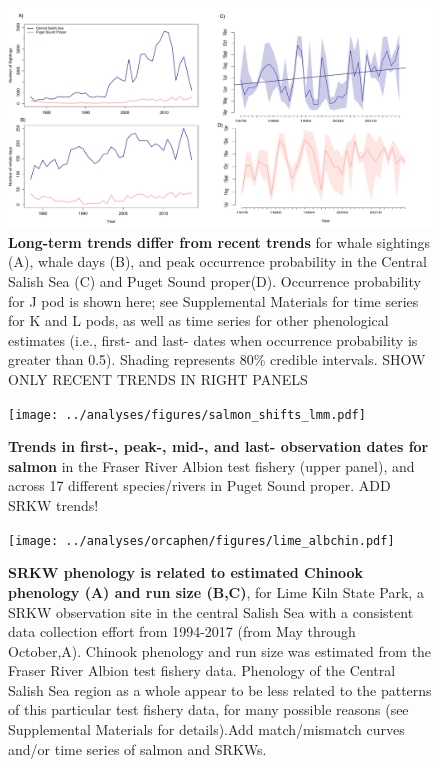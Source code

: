 \documentclass{article}
\begin{document}
\begin{figure}[p]
\includegraphics{../analyses/figures/OrcaPhenPlots/timeseries_1976_assumeSRKW2regs.pdf} 
\caption{\textbf{Long-term trends differ from recent trends} for whale sightings (A), whale days (B), and peak occurrence probability in the Central Salish Sea (C) and Puget Sound proper(D). Occurrence probability for J pod is shown here; see Supplemental Materials for time series for K and L pods, as well as time series for other phenological estimates (i.e., first- and last- dates when occurrence probability is greater than 0.5). Shading represents 80\% credible intervals. SHOW ONLY RECENT TRENDS IN RIGHT PANELS}
 \label{fig:timeseries}
 \end{figure}
 

\begin{figure}[p]
\texttt{[image: ../analyses/figures/salmon\_shifts\_lmm.pdf]} 
\caption{\textbf{Trends in first-, peak-, mid-, and last- observation dates for salmon} in the Fraser River Albion test fishery (upper panel), and across 17 different species/rivers in Puget Sound proper. ADD SRKW trends!}
 \label{fig:shifts}
 \end{figure}

\begin{figure}[p]
\texttt{[image: ../analyses/orcaphen/figures/lime\_albchin.pdf]} 
\caption{\textbf{SRKW phenology is related to estimated Chinook phenology (A) and run size (B,C)}, for Lime Kiln State Park, a SRKW observation site in the central Salish Sea with a consistent data collection effort from 1994-2017 (from May through October,A). Chinook phenology and run size was estimated from the Fraser River Albion test fishery data. Phenology of the Central Salish Sea region as a whole appear to be less related to the patterns of this particular test fishery data, for many possible reasons (see Supplemental Materials for details).Add match/mismatch curves and/or time series of salmon and SRKWs. }
 \label{fig:shifts}
 \end{figure}
\end{document}
